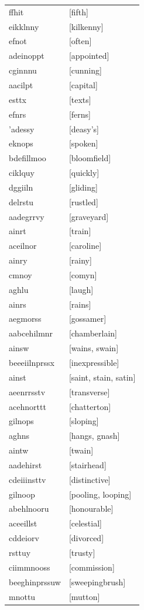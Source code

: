 \documentclass{article}
\begin{document}
\begin{tabular}{ll}
ffhit & [fifth] \\
eikklnny & [kilkenny] \\
efnot & [often] \\
adeinoppt & [appointed] \\
cginnnu & [cunning] \\
aacilpt & [capital] \\
esttx & [texts] \\
efnrs & [ferns] \\
'adessy & [deasy's] \\
eknops & [spoken] \\
bdefillmoo & [bloomfield] \\
ciklquy & [quickly] \\
dggiiln & [gliding] \\
delrstu & [rustled] \\
aadegrrvy & [graveyard] \\
ainrt & [train] \\
aceilnor & [caroline] \\
ainry & [rainy] \\
cmnoy & [comyn] \\
aghlu & [laugh] \\
ainrs & [rains] \\
aegmorss & [gossamer] \\
aabcehilmnr & [chamberlain] \\
ainsw & [wains, swain] \\
beeeiilnprssx & [inexpressible] \\
ainst & [saint, stain, satin] \\
aeenrrsstv & [transverse] \\
acehnorttt & [chatterton] \\
gilnops & [sloping] \\
aghns & [hangs, gnash] \\
aintw & [twain] \\
aadehirst & [stairhead] \\
cdeiiinsttv & [distinctive] \\
gilnoop & [pooling, looping] \\
abehlnooru & [honourable] \\
aceeillst & [celestial] \\
cddeiorv & [divorced] \\
rsttuy & [trusty] \\
ciimmnooss & [commission] \\
beeghinprssuw & [sweepingbrush] \\
mnottu & [mutton] \\

\end{tabular}
\end{document}
